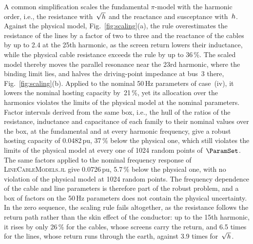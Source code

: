 A common simplification scales the fundamental $\pi$-model with the harmonic order, i.e., the resistance with~$\sqrt{h}$ and the reactance and susceptance with~$h$. Against the physical model, Fig.~\ref{fig:scaling}(a), the rule overestimates the resistance of the lines by a factor of two to three and the reactance of the cables by up to 2.4 at the 25th harmonic, as the screen return lowers their inductance, while the physical cable resistance exceeds the rule by up to 36\,\%. The scaled model thereby moves the parallel resonance near the 23rd harmonic, where the binding limit lies, and halves the driving-point impedance at bus~3 there, Fig.~\ref{fig:scaling}(b). Applied to the nominal 50\,Hz parameters of case~(iv), it lowers the nominal hosting capacity by~21\,\%, yet its allocation over the harmonics violates the limits of the physical model at the nominal parameters. Factor intervals derived from the same box, i.e., the hull of the ratios of the resistance, inductance and capacitance of each family to their nominal values over the box, at the fundamental and at every harmonic frequency, give a robust hosting capacity of 0.0482\,pu, 37\,\% below the physical one, which still violates the limits of the physical model at every one of 1024 random points of~$\ParamSet$. The same factors applied to the nominal frequency response of \textsc{LineCableModels.jl} give 0.0726\,pu, 5.7\,\% below the physical one, with no violation of the physical model at 1024 random points. The frequency dependence of the cable and line parameters is therefore part of the robust problem, and a box of factors on the 50\,Hz parameters does not contain the physical uncertainty. In the zero sequence, the scaling rule fails altogether, as the resistance follows the return path rather than the skin effect of the conductor: up to the 15th harmonic, it rises by only 26\,\% for the cables, whose screens carry the return, and 6.5 times for the lines, whose return runs through the earth, against 3.9 times for~$\sqrt{h}$.

